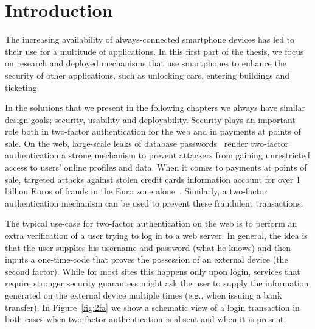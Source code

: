 \chapter{Introduction}
\label{chap:ps_introduction}

The increasing availability of always-connected smartphone devices has led to their use for a multitude of applications. In this first part of the thesis, we focus on research and deployed mechanisms that use smartphones to enhance the security of other applications, such as unlocking cars, entering buildings and ticketing.

In the solutions that we present in the following chapters we always have similar design goals; security, usability and deployability. Security plays an important role both in two-factor authentication for the web and in payments at points of sale. On the web, large-scale leaks of database passwords~\cite{yahoohack,linkedinhack,evernotehack} render two-factor authentication a strong mechanism to prevent attackers from gaining unrestricted access to users' online profiles and data. When it comes to payments at points of sale, targeted attacks against stolen credit cards information account for over 1 billion Euros of frauds in the Euro zone alone~\cite{ECB2012}. Similarly, a two-factor authentication mechanism can be used to prevent these fraudulent transactions.

The typical use-case for two-factor authentication on the web is to perform an extra verification of a user trying to log in to a web server. In general, the idea is that the user supplies his username and password (what he knows) and then inputs a one-time-code that proves the possession of an external device (the second factor). While for most sites this happens only upon login, services that require stronger security guarantees might ask the user to supply the information generated on the external device multiple times (e.g., when issuing a bank transfer). In Figure~\ref{fig:2fa} we show a schematic view of a login transaction in both cases when two-factor authentication is absent and when it is present.

